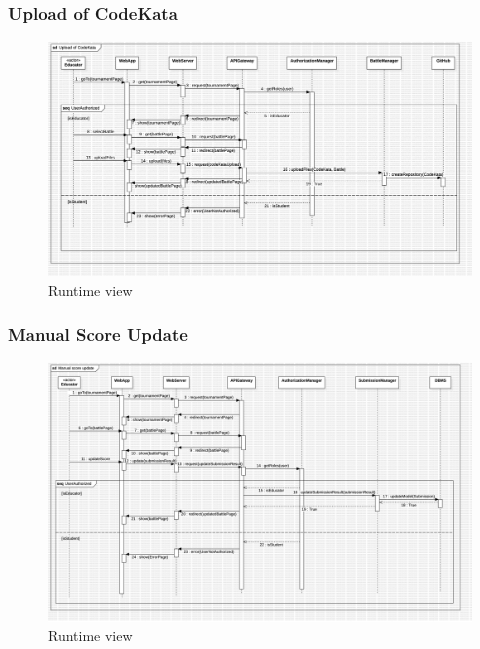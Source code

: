 \subsubsection*{Upload of CodeKata}
\begin{figure}[H]
    \centering
    \includegraphics[width=\textwidth]{Diagrams/UploadCodeKataSD.jpg}
    \caption{Runtime view}
    \label{fig:runtime_view}
\end{figure}

\subsubsection*{Manual Score Update}
\begin{figure}[H]
    \centering
    \includegraphics[width=\textwidth]{Diagrams/ManualScoreUpdateSD.jpg}
    \caption{Runtime view}
    \label{fig:runtime_view}
\end{figure}

